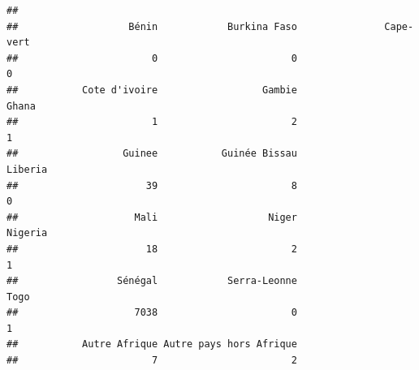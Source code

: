 \documentclass[
]{article}
\begin{document}
\begin{verbatim}
## 
##                   Bénin            Burkina Faso               Cape-vert 
##                       0                       0                       0 
##           Cote d'ivoire                  Gambie                   Ghana 
##                       1                       2                       1 
##                  Guinee           Guinée Bissau                 Liberia 
##                      39                       8                       0 
##                    Mali                   Niger                 Nigeria 
##                      18                       2                       1 
##                 Sénégal            Serra-Leonne                    Togo 
##                    7038                       0                       1 
##           Autre Afrique Autre pays hors Afrique 
##                       7                       2
\end{verbatim}
\end{document}
